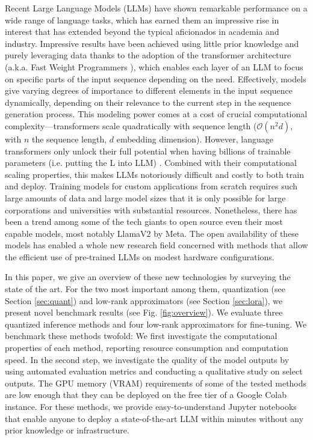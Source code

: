 \documentclass[conference]{IEEEtran}
\begin{document}
Recent Large Language Models (LLMs) have shown remarkable performance on a wide range of language tasks\cite{zhao_survey_2023}, which has earned them an impressive rise in interest \cite{segessenmann2023assessing} that has extended beyond the typical aficionados in academia and industry. Impressive results have been achieved using little prior knowledge and purely leveraging data \cite{stadelmann2022data} thanks to the adoption of the transformer architecture  \cite{vaswani_attention_2017} (a.k.a. Fast Weight Programmers \cite{DBLP:conf/icml/SchlagIS21}), which enables each layer of an LLM to focus on specific parts of the input sequence depending on the need. Effectively, models give varying degrees of importance to different elements in the input sequence dynamically, depending on their relevance to the current step in the sequence generation process. This modeling power comes at a cost of crucial computational complexity---transformers scale quadratically with sequence length ($\mathcal{O}(n^2 d)$, with $n$ the sequence length, $d$ embedding dimension). However, language transformers only unlock their full potential when having billions of trainable parameters (i.e. putting the L into LLM) \cite{scaling_laws_LLMs}. Combined with their computational scaling properties, this makes LLMs notoriously difficult and costly to both train and deploy. Training models for custom applications from scratch requires such large amounts of data and large model sizes that it is only possible for large corporations and universities with substantial resources. 
Nonetheless, there has been a trend among some of the tech giants to open source even their most capable models, most notably LlamaV2 \cite{touvron_llama_2023} by Meta. The open availability of these models has enabled a whole new research field concerned with methods that allow the efficient use of pre-trained LLMs on modest hardware configurations. 

In this paper, we give an overview of these new technologies by surveying the state of the art. For the two most important among them, quantization (see Section \ref{sec:quant}) and low-rank approximators (see Section  \ref{sec:lora}), we present novel benchmark results (see Fig. \ref{fig:overview}). We evaluate three quantized inference methods and four low-rank approximators for fine-tuning. We benchmark these methods twofold: We first investigate the computational properties of each method, reporting resource consumption and computation speed. In the second step, we investigate the quality of the model outputs by using automated evaluation metrics and conducting a qualitative study on select outputs. The GPU memory (VRAM) requirements of some of the tested methods are low enough that they can be deployed on the free tier of a Google Colab instance. For these methods, we provide easy-to-understand Jupyter notebooks that enable anyone to deploy a state-of-the-art LLM within minutes without any prior knowledge or infrastructure.
\end{document}
